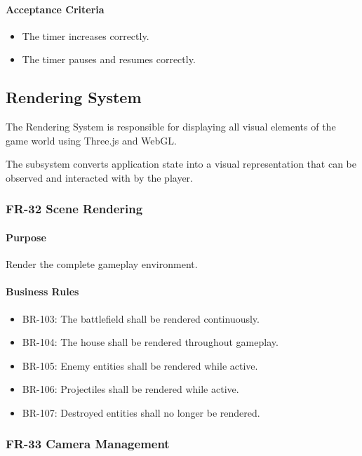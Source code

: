 \documentclass[11pt,a4paper]{article}
\begin{document}
\paragraph{Acceptance Criteria}
\begin{itemize}
  \item The timer increases correctly.
  \item The timer pauses and resumes correctly.
\end{itemize}

\subsection{Rendering System}

The Rendering System is responsible for displaying all visual elements of the
game world using Three.js and WebGL.

The subsystem converts application state into a visual representation that can be
observed and interacted with by the player.

\subsubsection{FR-32 Scene Rendering}

\paragraph{Purpose}
Render the complete gameplay environment.

\paragraph{Business Rules}
\begin{itemize}
  \item BR-103: The battlefield shall be rendered continuously.
  \item BR-104: The house shall be rendered throughout gameplay.
  \item BR-105: Enemy entities shall be rendered while active.
  \item BR-106: Projectiles shall be rendered while active.
  \item BR-107: Destroyed entities shall no longer be rendered.
\end{itemize}

\subsubsection{FR-33 Camera Management}
\end{document}
